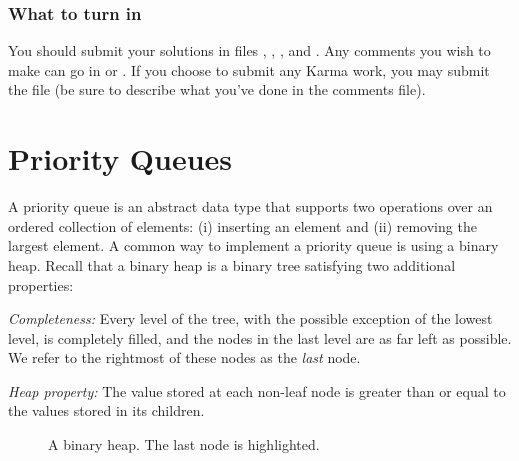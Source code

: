 \documentclass{pset}
\begin{document}
\section*{What to turn in}

You should submit your solutions in files ,
, , and
. Any comments you wish to make can go in
 or . If you choose to
submit any Karma work, you may submit the file  (be
sure to describe what you've done in the comments file).

\newpage{}
\part{Priority Queues}

A priority queue is an abstract data type that supports two operations
over an ordered collection of elements: (i) inserting an element and
(ii) removing the largest element. A common way to implement a
priority queue is using a binary heap. Recall that a binary heap is a
binary tree satisfying two additional properties:
\begin{description}
\item{\textit{Completeness:}} Every level of the tree, with the
  possible exception of the lowest level, is completely filled, and
  the nodes in the last level are as far left as possible. We refer to
  the rightmost of these nodes as the \emph{last} node.
\item{\textit{Heap property:}} The value stored at each non-leaf node
  is greater than or equal to the values stored in its children.
\end{description}

\begin{figure}
\begin{center}
\end{center}
\caption{A binary heap. The last node is highlighted.}
\label{fig:heap}
\end{figure}
\end{document}
